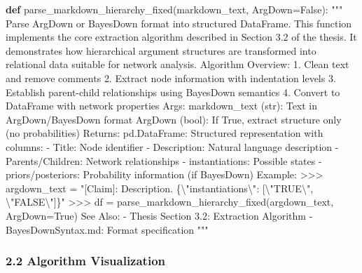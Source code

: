 \documentclass[
  11pt,
  letterpaper,
]{book}
\newenvironment{Shaded}{\begin{snugshade}}{\end{snugshade}}
\newcommand{\CharTok}[1]{\textcolor[rgb]{0.13,0.47,0.30}{#1}}
\newcommand{\CommentTok}[1]{\textcolor[rgb]{0.37,0.37,0.37}{#1}}
\newcommand{\KeywordTok}[1]{\textcolor[rgb]{0.00,0.23,0.31}{\textbf{#1}}}
\newcommand{\NormalTok}[1]{\textcolor[rgb]{0.00,0.23,0.31}{#1}}
\newcommand{\OperatorTok}[1]{\textcolor[rgb]{0.37,0.37,0.37}{#1}}
\newcommand{\VariableTok}[1]{\textcolor[rgb]{0.07,0.07,0.07}{#1}}
\begin{document}
\begin{Shaded}
\begin{Highlighting}[]
\KeywordTok{def}\NormalTok{ parse\_markdown\_hierarchy\_fixed(markdown\_text, ArgDown}\OperatorTok{=}\VariableTok{False}\NormalTok{):}
    \CommentTok{"""}
\CommentTok{    Parse ArgDown or BayesDown format into structured DataFrame.}
\CommentTok{    }
\CommentTok{    This function implements the core extraction algorithm described in }
\CommentTok{    Section 3.2 of the thesis. It demonstrates how hierarchical argument }
\CommentTok{    structures are transformed into relational data suitable for network analysis.}
\CommentTok{    }
\CommentTok{    Algorithm Overview:}
\CommentTok{    1. Clean text and remove comments}
\CommentTok{    2. Extract node information with indentation levels}
\CommentTok{    3. Establish parent{-}child relationships using BayesDown semantics}
\CommentTok{    4. Convert to DataFrame with network properties}
\CommentTok{    }
\CommentTok{    Args:}
\CommentTok{        markdown\_text (str): Text in ArgDown/BayesDown format}
\CommentTok{        ArgDown (bool): If True, extract structure only (no probabilities)}
\CommentTok{        }
\CommentTok{    Returns:}
\CommentTok{        pd.DataFrame: Structured representation with columns:}
\CommentTok{            {-} Title: Node identifier}
\CommentTok{            {-} Description: Natural language description}
\CommentTok{            {-} Parents/Children: Network relationships}
\CommentTok{            {-} instantiations: Possible states}
\CommentTok{            {-} priors/posteriors: Probability information (if BayesDown)}
\CommentTok{            }
\CommentTok{    Example:}
\CommentTok{        \textgreater{}\textgreater{}\textgreater{} argdown\_text = "[Claim]: Description. \{}\CharTok{\textbackslash{}"}\CommentTok{instantiations}\CharTok{\textbackslash{}"}\CommentTok{: [}\CharTok{\textbackslash{}"}\CommentTok{TRUE}\CharTok{\textbackslash{}"}\CommentTok{, }\CharTok{\textbackslash{}"}\CommentTok{FALSE}\CharTok{\textbackslash{}"}\CommentTok{]\}"}
\CommentTok{        \textgreater{}\textgreater{}\textgreater{} df = parse\_markdown\_hierarchy\_fixed(argdown\_text, ArgDown=True)}
\CommentTok{        }
\CommentTok{    See Also:}
\CommentTok{        {-} Thesis Section 3.2: Extraction Algorithm}
\CommentTok{        {-} BayesDownSyntax.md: Format specification}
\CommentTok{    """}
\end{Highlighting}
\end{Shaded}

\subsubsection{2.2 Algorithm
Visualization}\label{algorithm-visualization}
\end{document}
